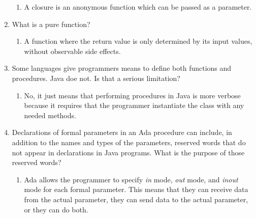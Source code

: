 \begin{enumerate}
  
    \begin{answer}

    \begin{enumerate}
    \item A closure is an anonymous function which can be passed as a
      parameter.
    \end{enumerate}

    \end{answer}

  \item What is a pure function?

  
    \begin{answer}

    \begin{enumerate}
    \item A function where the return value is only determined by its
      input values, without observable side effects.
    \end{enumerate}

    \end{answer}

  \item Some languages give programmers means to define
    both functions and procedures. Java doe not. Is that
    a serious limitation?

  
    \begin{answer}

    \begin{enumerate}
    \item No, it just means that performing procedures in Java is more
      verbose because it requires that the programmer instantiate the
      class with any needed methods.
 
    \end{enumerate}

    \end{answer}

  \item Declarations of formal parameters in an Ada procedure
    can include, in addition to the names and types of the
    parameters, reserved words that do not appear in declarations
    in Java programs. 
    What is the purpose of those reserved words?
 
  
    \begin{answer}

    \begin{enumerate}
    \item Ada allows the programmer to specify \textit{in} mode,
      \textit{out} mode, and \textit{inout} mode for each formal
      parameter.  This means that they can receive data from the
      actual parameter, they can send data to the actual parameter, or
      they can do both.
    \end{enumerate}


\end{answer}
\end{enumerate}
